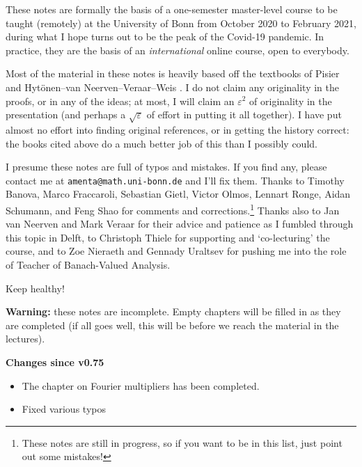 These notes are formally the basis of a one-semester master-level course to be taught (remotely) at the University of Bonn from October 2020 to February 2021, during what I hope turns out to be the peak of the Covid-19 pandemic.
In practice, they are the basis of an \emph{international} online course, open to everybody.

Most of the material in these notes is heavily based off the textbooks of Pisier \cite{gP16} and Hyt\"onen--van Neerven--Veraar--Weis \cite{HNVW16, HNVW17}.
I do not claim any originality in the proofs, or in any of the ideas; at most, I will claim an $\varepsilon^2$ of originality in the presentation (and perhaps a $\sqrt{\varepsilon}$ of effort in putting it all together).
I have put almost no effort into finding original references, or in getting the history correct: the books cited above do a much better job of this than I possibly could.

\vspace{1cm}

I presume these notes are full of typos and mistakes.
If you find any, please contact me at \texttt{amenta@math.uni-bonn.de} and I'll fix them.
Thanks to Timothy Banova, Marco Fraccaroli, Sebastian Gietl, Victor Olmos, Lennart Ronge, Aidan Schumann, and Feng Shao for comments and corrections.\footnote{These notes are still in progress, so if you want to be in this list, just point out some mistakes!}
Thanks also to Jan van Neerven and Mark Veraar for their advice and patience as I fumbled through this topic in Delft, to Christoph Thiele for supporting and `co-lecturing' the course, and to Zoe Nieraeth and Gennady Uraltsev for pushing me into the role of Teacher of Banach-Valued Analysis.

\vspace{0.5cm}

Keep healthy! 




\vspace{1cm}

\textbf{Warning:} these notes are incomplete.
Empty chapters will be filled in as they are completed (if all goes well, this will be before we reach the material in the lectures).

\textbf{Changes since v0.75}
\begin{itemize}
\item The chapter on Fourier multipliers has been completed.
\item Fixed various typos
\end{itemize}

